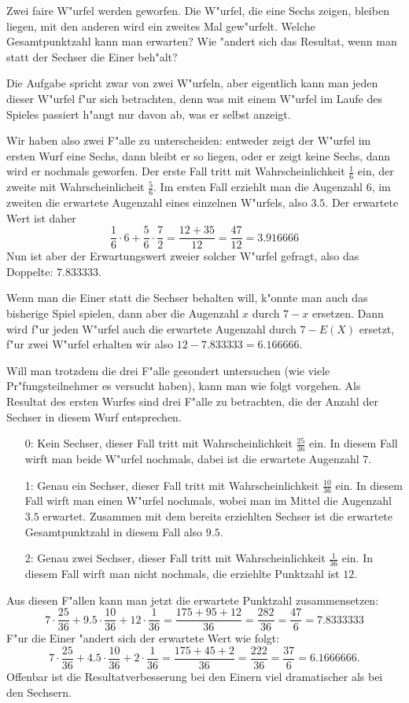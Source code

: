 Zwei faire W"urfel werden geworfen. Die W"urfel, die eine Sechs
zeigen, bleiben liegen, mit den anderen wird ein zweites Mal gew"urfelt.
Welche Gesamtpunktzahl kann man erwarten?
Wie "andert sich das Resultat, wenn man statt der Sechser die Einer
beh"alt?

\begin{loesung}
Die Aufgabe spricht zwar von zwei W"urfeln, aber eigentlich kann man
jeden dieser W"urfel f"ur sich betrachten, denn was mit einem W"urfel
im Laufe des Spieles passiert h"angt nur davon ab, was er selbst
anzeigt.

Wir haben also zwei F"alle zu unterscheiden: entweder zeigt der
W"urfel im ersten Wurf eine Sechs, dann bleibt er so liegen,
oder er zeigt keine Sechs, dann wird er nochmals geworfen.
Der erste Fall tritt mit Wahrscheinlichkeit $\frac16$ ein,
der zweite mit Wahrscheinlicheit $\frac56$. Im ersten Fall
erziehlt man die Augenzahl $6$, im zweiten die erwartete
Augenzahl eines einzelnen W"urfels, also $3.5$. Der erwartete
Wert ist daher
\[
\frac16\cdot 6 +\frac56\cdot\frac72=\frac{12+35}{12}=\frac{47}{12}=3.916666
\]
Nun ist aber der Erwartungswert zweier solcher W"urfel
gefragt, also das Doppelte: $7.833333$.

Wenn man die Einer statt die Sechser behalten will, k"onnte man
auch das bisherige Spiel spielen, dann aber die Augenzahl
$x$ durch $7-x$ ersetzen. Dann wird f"ur jeden W"urfel auch
die erwartete Augenzahl durch $7-E(X)$ ersetzt, f"ur zwei
W"urfel erhalten wir also $12-7.833333 = 6.166666$.

Will man trotzdem die drei F"alle gesondert untersuchen (wie
viele Pr"fungsteilnehmer es versucht haben), kann man wie
folgt vorgehen.
Als Resultat des ersten Wurfes sind drei F"alle zu betrachten, die
der Anzahl der Sechser in diesem Wurf entsprechen.
\begin{itemize}
\item[0:] Kein Sechser, dieser Fall tritt mit Wahrscheinlichkeit
$\frac{25}{36}$ ein.  In diesem Fall wirft man beide W"urfel nochmals,
dabei ist die erwartete Augenzahl $7$.
\item[1:] Genau ein Sechser, dieser Fall tritt mit Wahrscheinlichkeit
$\frac{10}{36}$ ein.  In diesem Fall wirft man einen W"urfel nochmals,
wobei man im Mittel die Augenzahl $3.5$ erwartet.  Zusammen mit dem
bereits erziehlten Sechser ist die erwartete Gesamtpunktzahl in diesem
Fall also $9.5$.
\item[2:] Genau zwei Sechser, dieser Fall tritt mit Wahrscheinlichkeit
$\frac{1}{36}$ ein.  In diesem Fall wirft man nicht nochmals, die
erziehlte Punktzahl ist $12$.
\end{itemize}
Aus diesen F"allen kann man jetzt die erwartete Punktzahl zusammensetzen:
\[
7\cdot \frac{25}{36}
+
9.5\cdot \frac{10}{36}
+
12\cdot\frac{1}{36}
=
\frac{175+95+12}{36}=\frac{282}{36}=\frac{47}{6}
=7.8333333
\]
F"ur die Einer "andert sich der erwartete Wert wie folgt:
\[
7\cdot \frac{25}{36}
+
4.5\cdot \frac{10}{36}
+
2\cdot\frac{1}{36}
=
\frac{175+45+2}{36}=\frac{222}{36}=\frac{37}{6}
=6.1666666.
\]
Offenbar ist die Resultatverbesserung bei den Einern viel dramatischer
als bei den Sechsern.
\end{loesung}

